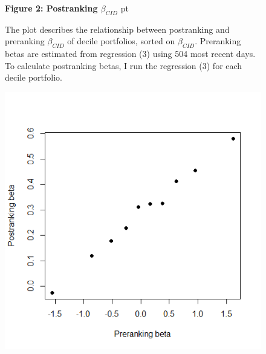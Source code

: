 \documentclass[12pt]{article}
\begin{document}
\begin{figure}
\textbf{Figure 2: Postranking $\beta_{CID}$}
 pt
\begin{flushleft}
{The plot describes the relationship between postranking and preranking $\beta_{CID}$ of decile portfolios, sorted on $\beta_{CID}$. Preranking betas are estimated from regression (3) using 504 most recent days. To calculate postranking betas, I run the  regression (3) for each decile portfolio.}
\end{flushleft}
\centering
\includegraphics[width=1\textwidth]{Figure2.png}
\end{figure}
\end{document}
